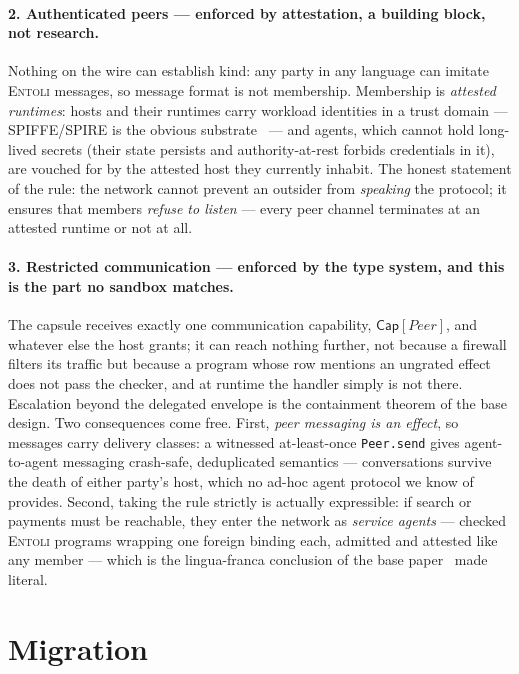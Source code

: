\documentclass[sigplan,10pt]{acmart}
\newcommand{\Cap}[1]{\mathsf{Cap}[#1]}
\begin{document}
\paragraph{2. Authenticated peers — enforced by attestation, a building
block, not research.} Nothing on the wire can establish kind: any party
in any language can imitate \textsc{Entoli} messages, so message format
is not membership. Membership is \emph{attested runtimes}: hosts and
their runtimes carry workload identities in a trust domain ---
SPIFFE/SPIRE is the obvious substrate~\cite{spiffe} --- and agents,
which cannot hold long-lived secrets (their state persists and
authority-at-rest forbids credentials in it), are vouched for by the
attested host they currently inhabit. The honest statement of the rule:
the network cannot prevent an outsider from \emph{speaking} the
protocol; it ensures that members \emph{refuse to listen} --- every
peer channel terminates at an attested runtime or not at all.

\paragraph{3. Restricted communication — enforced by the type system,
and this is the part no sandbox matches.} The capsule receives exactly
one communication capability, $\Cap{Peer}$, and whatever else the host
grants; it can reach nothing further, not because a firewall filters
its traffic but because a program whose row mentions an ungrated effect
does not pass the checker, and at runtime the handler simply is not
there. Escalation beyond the delegated envelope is the containment
theorem of the base design. Two consequences come free. First,
\emph{peer messaging is an effect}, so messages carry delivery classes:
a witnessed at-least-once \texttt{Peer.send} gives agent-to-agent
messaging crash-safe, deduplicated semantics --- conversations survive
the death of either party's host, which no ad-hoc agent protocol we
know of provides. Second, taking the rule strictly is actually
expressible: if search or payments must be reachable, they enter the
network as \emph{service agents} --- checked \textsc{Entoli} programs
wrapping one foreign binding each, admitted and attested like any
member --- which is the lingua-franca conclusion of the base
paper~\cite{entoli2026} made literal.

\section{Migration}
\end{document}
